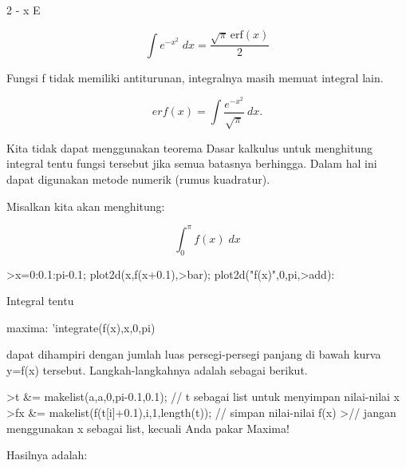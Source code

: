 \documentclass[a4paper,10pt]{article}
\begin{document}
\begin{eulernotebook}
\begin{eulercomment}
\begin{eulercomment}
\begin{eulercomment}
\begin{eulercomment}
\begin{eulercomment}
\begin{eulercomment}
\begin{eulercomment}
\begin{eulercomment}
\begin{euleroutput}
                                      2
                                   - x
                                  E
  
\end{euleroutput}
\begin{eulerformula}
\[
\int {e^ {- x^2 }}{\;dx}=\frac{\sqrt{\pi}\,\mathrm{erf}\left(x
 \right)}{2}
\]
\end{eulerformula}
\begin{eulercomment}
Fungsi f tidak memiliki antiturunan, integralnya masih memuat integral
lain.

\end{eulercomment}
\begin{eulerformula}
\[
erf(x) = \int \frac{e^{-x^2}}{\sqrt{\pi}} \ dx.
\]
\end{eulerformula}
\begin{eulercomment}
Kita tidak dapat menggunakan teorema Dasar kalkulus untuk menghitung
integral tentu fungsi tersebut jika semua batasnya berhingga. Dalam
hal ini dapat digunakan metode numerik (rumus kuadratur).

Misalkan kita akan menghitung:

\end{eulercomment}
\begin{eulerformula}
\[
\int_{0}^{\pi}{f\left(x\right)\;dx}
\]
\end{eulerformula}
\begin{eulerprompt}
>x=0:0.1:pi-0.1; plot2d(x,f(x+0.1),>bar); plot2d("f(x)",0,pi,>add):
\end{eulerprompt}
\begin{eulercomment}
Integral tentu

maxima: 'integrate(f(x),x,0,pi)

dapat dihampiri dengan jumlah luas persegi-persegi panjang di bawah
kurva y=f(x) tersebut. Langkah-langkahnya adalah sebagai berikut.
\end{eulercomment}
\begin{eulerprompt}
>t &= makelist(a,a,0,pi-0.1,0.1); // t sebagai list untuk menyimpan nilai-nilai x
>fx &= makelist(f(t[i]+0.1),i,1,length(t)); // simpan nilai-nilai f(x)
>// jangan menggunakan x sebagai list, kecuali Anda pakar Maxima!
\end{eulerprompt}
\begin{eulercomment}
Hasilnya adalah:


\end{eulercomment}
\end{eulercomment}
\end{eulercomment}
\end{eulercomment}
\end{eulercomment}
\end{eulercomment}
\end{eulercomment}
\end{eulercomment}
\end{eulercomment}
\end{eulernotebook}
\end{document}

